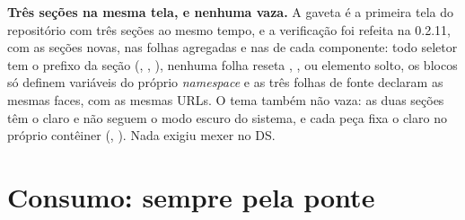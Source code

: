 \begin{nota}
\textbf{Três seções na mesma tela, e nenhuma vaza.} A gaveta é a primeira tela
do repositório com três seções ao mesmo tempo, e a verificação foi refeita na
0.2.11, com as seções novas, nas folhas agregadas e nas de cada componente: todo
seletor tem o prefixo da seção (, , ),
nenhuma folha reseta , , \cd{*} ou elemento solto, os blocos
 só definem variáveis do próprio \emph{namespace} e as três folhas de
fonte declaram as mesmas faces, com as mesmas URLs. O tema também não vaza: as
duas seções têm o  claro e não seguem o modo escuro do sistema, e cada
peça fixa o claro no próprio contêiner (,
). Nada exigiu mexer no DS.
\end{nota}

\section{Consumo: sempre pela ponte}

